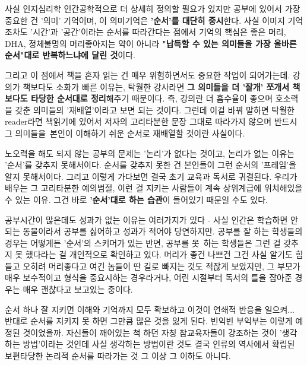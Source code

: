 사실 인지심리학 인간공학적으로 더 상세히 정의할 필요가 있지만
공부에 있어서 가장 중요한 건 '의미' 기억이며, 이 의미기억은 \textbf{'순서'를 대단히 중시}한다.
사실 이미지 기억조차도 '시간'과 '공간'이라는 순서를 따라간다는 점에서
기억의 핵심은 좋은 머리, DHA, 정체불명의 머리좋아지는 약이 아니라
\textbf{"납득할 수 있는 의미들을 가장 올바른 순서"대로 반복하느냐에 달린 것}이다.
\vspace{5mm}

그리고 이 점에서 책을 혼자 읽는 건 매우 위험하면서도 중요한 작업이 되어가는데.
강의가 책보다도 소화가 빠른 이유는, 탁월한 강사라면 \textbf{그 의미들을 더 '잘개' 쪼개서 책보다도 타당한 순서대로 정리}해주기 때문이다.
즉, 강의란 더 흡수율이 좋으며 호소력을 갖춘 의미들의 '재배열'이라고 보면 되는 것이다.
그런데 이걸 바꿔 말하면 탁월한 reader라면 책읽기에 있어서 저자의 고리타분한 문장 그대로 따라가지 않으며
반드시 그 의미들을 본인이 이해하기 쉬운 순서로 재배열할 것이란 사실이다.
\vspace{5mm}

노오력을 해도 되지 않는 공부의 문제는 '논리'가 없다는 것이고, 논리가 없는 이유는 '순서'를 갖추지 못해서이다.
순서를 갖추지 못한 건 본인들이 그런 순서의 '프레임'을 알지 못해서이다. 그리고 이렇게 가다보면 결국 초기 교육과 독서로 귀결된다.
우리가 배우는 그 고리타분한 예의범절, 이런 걸 지키는 사람들이 계속 상위계급에 위치해있을 수 있는 이유.
그건 바로 \textbf{'순서'대로 하는 습관}이 들어있기 때문일 수도 있다.
\vspace{5mm}

공부시간이 많은데도 성과가 없는 이유는 여러가지가 있다 - 사실 인간은 학습하면 안 되는 동물이라서 공부를 싫어하고 성과가 적어야 당연하지만.
공부를 잘 하는 학생들의 경우는 어떻게든 '순서'의 스키머가 있는 반면,
공부를 못 하는 학생들은 그런 걸 갖추지 못 했다라는 걸 개인적으로 확인하고 있다.
머리가 좋건 나쁘건 그건 사실 알기도 힘들고 오히려 머리좋다고 여긴 놈들이 딴 길로 빠지는 것도 적잖게 보았지만,
그 부모가 매우 보수적이고 형식을 중요시하는 경우라거나, 어린 시절부터 독서의 틀을 잡아준 경우는 매우 괜찮다고 보고있는 중이다.
\vspace{5mm}

순서 하나 잘 지키면 이해와 기억까지 모두 확보하고 이것이 연쇄적 반응을 일으켜...
반대로 순서를 지키지 못 하면 그만큼 많은 것을 잃게 된다. 빈익빈 부익부는 이렇게 예정된 것이었을까.
자신들이 깨어있는 척 하던 자칭 참교육자들이 강조하는 것이 '생각하는 방법'이라는 것인데
사실 생각하는 방법이란 것도 결국 인류의 역사에서 확립된 보편타당한 논리적 순서를 따라가는 것 그 이상 그 이하도 아니다.
\vspace{5mm}

